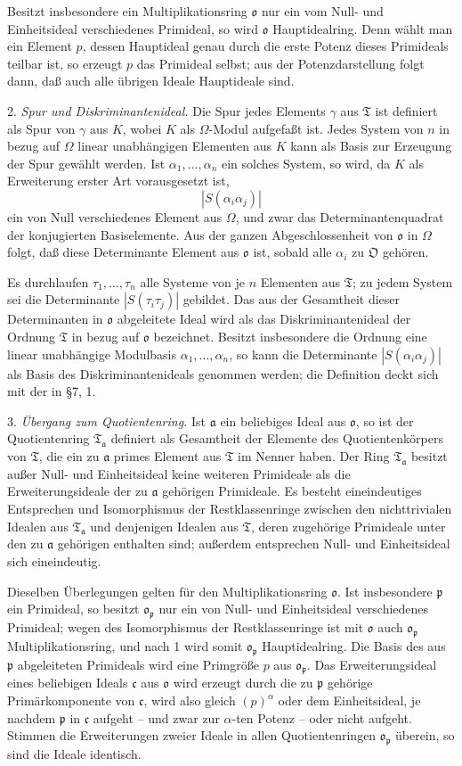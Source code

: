 \documentclass[11pt]{article}
\providecommand{\mT}{\mathfrak{T}}
\providecommand{\mO}{\mathfrak{O}}
\providecommand{\mo}{\mathfrak{o}}
\providecommand{\ma}{\mathfrak{a}}
\providecommand{\mc}{\mathfrak{c}}
\providecommand{\mpideal}{\mathfrak{p}}
\begin{document}
Besitzt insbesondere ein Multiplikationsring $\mo$ nur ein vom Null- und Einheitsideal verschiedenes Primideal, so wird $\mo$ Hauptidealring. Denn wählt man ein Element $p$, dessen Hauptideal genau durch die erste Potenz dieses Primideals teilbar ist, so erzeugt $p$ das Primideal selbst; aus der Potenzdarstellung folgt dann, daß auch alle übrigen Ideale Hauptideale sind.

2. \emph{Spur und Diskriminantenideal.} Die Spur jedes Elements $\gamma$ aus $\mT$ ist definiert als Spur von $\gamma$ aus $K$, wobei $K$ als $\Omega$-Modul aufgefaßt ist. Jedes System von $n$ in bezug auf $\Omega$ linear unabhängigen Elementen aus $K$ kann als Basis zur Erzeugung der Spur gewählt werden. Ist $\alpha_1,\ldots,\alpha_n$ ein solches System, so wird, da $K$ als Erweiterung erster Art vorausgesetzt ist,
\[
        |S(\alpha_i\alpha_j)|
\]
ein von Null verschiedenes Element aus $\Omega$, und zwar das Determinantenquadrat der konjugierten Basiselemente. Aus der ganzen Abgeschlossenheit von $\mo$ in $\Omega$ folgt, daß diese Determinante Element aus $\mo$ ist, sobald alle $\alpha_i$ zu $\mO$ gehören.

Es durchlaufen $\tau_1,\ldots,\tau_n$ alle Systeme von je $n$ Elementen aus $\mT$; zu jedem System sei die Determinante $|S(\tau_i\tau_j)|$ gebildet. Das aus der Gesamtheit dieser Determinanten in $\mo$ abgeleitete Ideal wird als das Diskriminantenideal der Ordnung $\mT$ in bezug auf $\mo$ bezeichnet. Besitzt insbesondere die Ordnung eine linear unabhängige Modulbasis $\alpha_1,\ldots,\alpha_n$, so kann die Determinante $|S(\alpha_i\alpha_j)|$ als Basis des Diskriminantenideals genommen werden; die Definition deckt sich mit der in §7, 1.

3. \emph{Übergang zum Quotientenring.} Ist $\ma$ ein beliebiges Ideal aus $\mo$, so ist der Quotientenring $\mT_\ma$ definiert als Gesamtheit der Elemente des Quotientenkörpers von $\mT$, die ein zu $\ma$ primes Element aus $\mT$ im Nenner haben. Der Ring $\mT_\ma$ besitzt außer Null- und Einheitsideal keine weiteren Primideale als die Erweiterungsideale der zu $\ma$ gehörigen Primideale. Es besteht eineindeutiges Entsprechen und Isomorphismus der Restklassenringe zwischen den nichttrivialen Idealen aus $\mT_\ma$ und denjenigen Idealen aus $\mT$, deren zugehörige Primideale unter den zu $\ma$ gehörigen enthalten sind; außerdem entsprechen Null- und Einheitsideal sich eineindeutig.

Dieselben Überlegungen gelten für den Multiplikationsring $\mo$. Ist insbesondere $\mpideal$ ein Primideal, so besitzt $\mo_\mpideal$ nur ein von Null- und Einheitsideal verschiedenes Primideal; wegen des Isomorphismus der Restklassenringe ist mit $\mo$ auch $\mo_\mpideal$ Multiplikationsring, und nach 1 wird somit $\mo_\mpideal$ Hauptidealring. Die Basis des aus $\mpideal$ abgeleiteten Primideals wird eine Primgröße $p$ aus $\mo_\mpideal$. Das Erweiterungsideal eines beliebigen Ideals $\mc$ aus $\mo$ wird erzeugt durch die zu $\mpideal$ gehörige Primärkomponente von $\mc$, wird also gleich $(p)^\alpha$ oder dem Einheitsideal, je nachdem $\mpideal$ in $\mc$ aufgeht -- und zwar zur $\alpha$-ten Potenz -- oder nicht aufgeht. Stimmen die Erweiterungen zweier Ideale in allen Quotientenringen $\mo_\mpideal$ überein, so sind die Ideale identisch.
\end{document}
